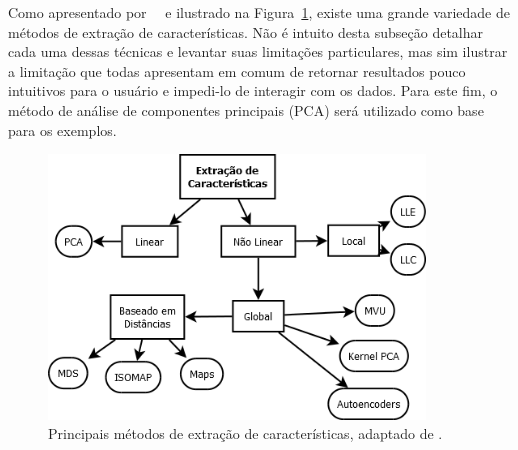 Como apresentado por~\citeauthor{Maaten2009}~\cite{Maaten2009} e ilustrado na Figura~\ref{fig:fex}, existe uma grande variedade de métodos de extração de características. Não é intuito desta subseção detalhar cada uma dessas técnicas e levantar suas limitações particulares, mas sim ilustrar a limitação que todas apresentam em comum de retornar resultados pouco intuitivos para o usuário e impedi-lo de interagir com os dados. Para este fim, o método de análise de componentes principais (PCA) será utilizado como base para os exemplos.

\begin{figure}[h!]
    \centering
    \includegraphics[width=10cm]{images/fex.png}
    \caption[Principais Métodos de Extração de Características.]{Principais métodos de extração de características, adaptado de \cite{Maaten2009}.}
    \label{fig:fex}
\end{figure}



